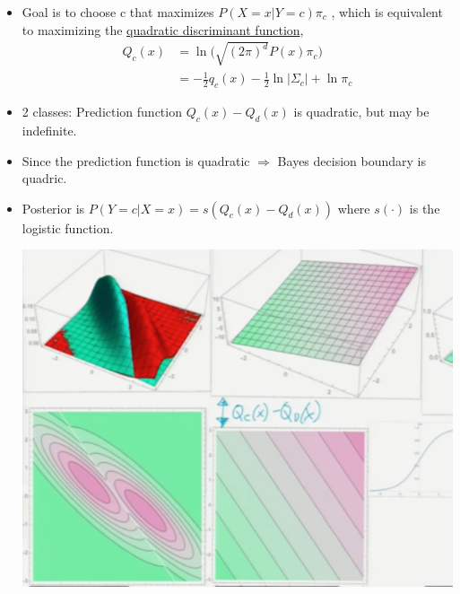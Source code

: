 \documentclass[10pt]{article}
\begin{document}
\begin{itemize}
\begin{itemize}
						\item Goal is to choose c that maximizes $P(X=x|Y=c)\pi_{c}$ , which is equivalent to maximizing the \underline{quadratic discriminant function},
							\begin{align*}
								Q_{c}(x) &= \ln \Big(\sqrt{(2\pi)^{d}}P(x)\pi_{c}\Big)\\
										&= -\frac{1}{2}q_{c}(x)-\frac{1}{2} \ln |\Sigma_{c}| + \ln \pi_{c}
							\end{align*}
						\item 2 classes: Prediction function $Q_{c}(x) - Q_{d}(x)$ is quadratic, but may be indefinite.
						\item Since the prediction function is quadratic $\Rightarrow$ Bayes decision boundary is quadric.
						\item Posterior is $P(Y=c|X=x) = s(Q_{c}(x) - Q_{d}(x))$ where $s(\cdot)$ is the logistic function.
							\begin{center}
								\includegraphics[scale=0.5]{images/LDA}
							\end{center} 
					\end{itemize}
				

\end{itemize}
\end{document}
